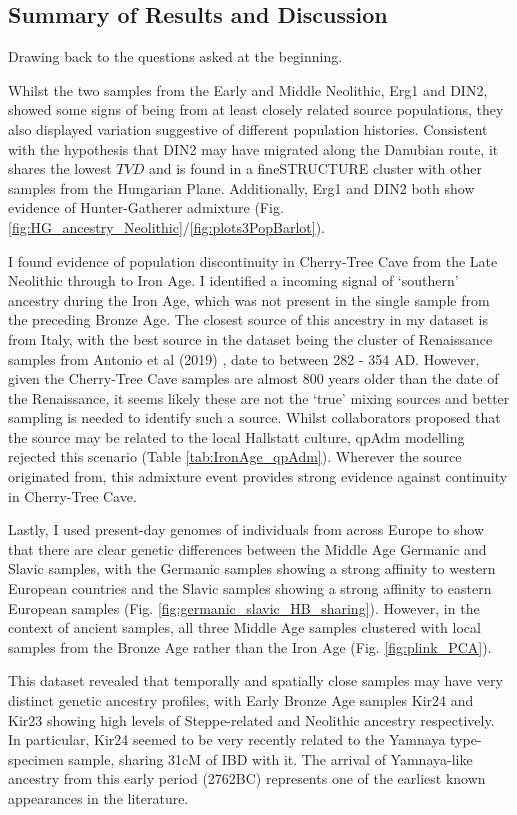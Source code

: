 \subsection{Summary of Results and Discussion}

Drawing back to the questions asked at the beginning.

Whilst the two samples from the Early and Middle Neolithic, Erg1 and DIN2, showed some signs of being from at least closely related source populations, they also displayed variation suggestive of different population histories. Consistent with the hypothesis that DIN2 may have migrated along the Danubian route, it shares the lowest $TVD$ and is found in a fineSTRUCTURE cluster with other samples from the Hungarian Plane. Additionally, Erg1 and DIN2 both show evidence of Hunter-Gatherer admixture  (Fig. \ref{fig:HG_ancestry_Neolithic}/\ref{fig:plots3PopBarlot}).

I found evidence of population discontinuity in Cherry-Tree Cave from the Late Neolithic through to Iron Age. I identified a incoming signal of `southern' ancestry during the Iron Age, which was not present in the single sample from the preceding Bronze Age. The closest source of this ancestry in my dataset is from Italy, with the best source in the dataset being the cluster of Renaissance samples from Antonio et al (2019) \cite{antonio2019ancient}, date to between 282 - 354 AD. However, given the Cherry-Tree Cave samples are almost 800 years older than the date of the Renaissance, it seems likely these are not the `true' mixing sources and better sampling is needed to identify such a source. Whilst collaborators proposed that the source may be related to the local Hallstatt culture, qpAdm modelling rejected this scenario (Table \ref{tab:IronAge_qpAdm}). Wherever the source originated from, this admixture event provides strong evidence against continuity in Cherry-Tree Cave. 

Lastly, I used present-day genomes of individuals from across Europe to show that there are clear genetic differences between the Middle Age Germanic and Slavic samples, with the Germanic samples showing a strong affinity to western European countries and the Slavic samples showing a strong affinity to eastern European samples (Fig. \ref{fig:germanic_slavic_HB_sharing}). However, in the context of ancient samples, all three Middle Age samples clustered with local samples from the Bronze Age rather than the Iron Age (Fig. \ref{fig:plink_PCA}). 

This dataset revealed that temporally and spatially close samples may have very distinct genetic ancestry profiles, with Early Bronze Age samples Kir24 and Kir23 showing high levels of Steppe-related and Neolithic ancestry respectively. In particular, Kir24 seemed to be very recently related to the Yamnaya type-specimen sample, sharing 31cM of IBD with it. The arrival of Yamnaya-like ancestry from this early period (2762BC) represents one of the earliest known appearances in the literature. 

